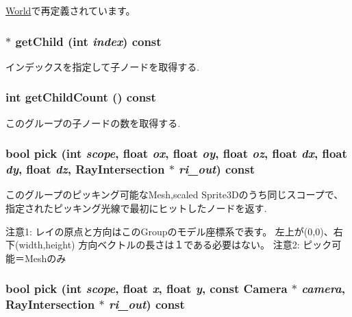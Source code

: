 \hyperlink{classm3g_1_1World_efde97aaf753d48fff769d9011f187f2}{World}で再定義されています。\hypertarget{classm3g_1_1Group_a3af7d07fde341ef751157d274538698}{
\subsubsection[{getChild}]{ $\ast$ getChild (int {\em index}) const}}
\label{classm3g_1_1Group_a3af7d07fde341ef751157d274538698}


インデックスを指定して子ノードを取得する. \hypertarget{classm3g_1_1Group_756d01dca16e146d69bb1881aca8fbb7}{
\subsubsection[{getChildCount}]{\setlength{\rightskip}{0pt plus 5cm}int getChildCount () const}}
\label{classm3g_1_1Group_756d01dca16e146d69bb1881aca8fbb7}


このグループの子ノードの数を取得する. \hypertarget{classm3g_1_1Group_10a3c77fa36fdb5d09b2bf39fe2a7c0b}{
\subsubsection[{pick}]{\setlength{\rightskip}{0pt plus 5cm}bool pick (int {\em scope}, \/  float {\em ox}, \/  float {\em oy}, \/  float {\em oz}, \/  float {\em dx}, \/  float {\em dy}, \/  float {\em dz}, \/  {\bf RayIntersection} $\ast$ {\em ri\_\-out}) const}}
\label{classm3g_1_1Group_10a3c77fa36fdb5d09b2bf39fe2a7c0b}


このグループのピッキング可能なMesh,scaled Sprite3Dのうち同じスコープで、指定されたピッキング光線で最初にヒットしたノードを返す.

注意1: レイの原点と方向はこのGroupのモデル座標系で表す。 左上が(0,0)、右下(width,height) 方向ベクトルの長さは１である必要はない。 注意2: ピック可能＝Meshのみ \hypertarget{classm3g_1_1Group_cfd72d6baf225d638f1436bb45e958dd}{
\subsubsection[{pick}]{\setlength{\rightskip}{0pt plus 5cm}bool pick (int {\em scope}, \/  float {\em x}, \/  float {\em y}, \/  const {\bf Camera} $\ast$ {\em camera}, \/  {\bf RayIntersection} $\ast$ {\em ri\_\-out}) const}}
\label{classm3g_1_1Group_cfd72d6baf225d638f1436bb45e958dd}


